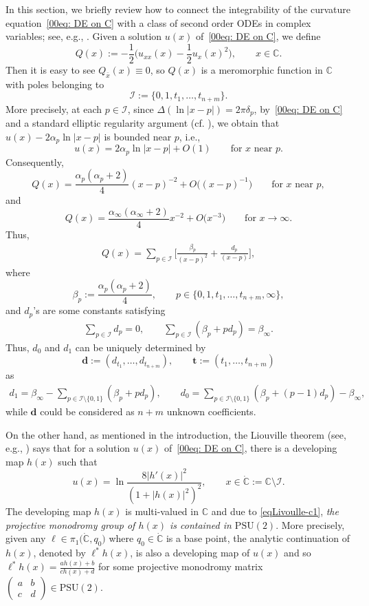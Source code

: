 \documentclass[10pt,a4paper]{amsart}
\numberwithin{equation}{section}
\def\C{\mathbb C}
\def\PSU{\mathrm{PSU}}
\def\SM#1#2#3#4{\left(\begin{smallmatrix}#1&#2\\#3&#4\end{smallmatrix}
 \right)}
\def\bt{\boldsymbol t}
\begin{document}
In this section, we briefly review how to connect the integrability of the curvature equation~\eqref{00eq: DE on C} with a class of second order ODEs in complex variables; see, e.g., \cite{Chai-Lin-Wang,Coaxial}. Given a solution $u(x)$ of~\eqref{00eq: DE on C}, we define
\begin{equation*}%
 Q(x):=-\frac12\biggl(u_{xx}(x)-\frac12 u_x(x)^2\biggr),\qquad
 x\in\mathbb{C}.
\end{equation*}
Then it is easy to see $Q_{\bar{x}}(x)\equiv 0$, so $Q(x)$ is a meromorphic function in $\mathbb{C}$ with poles belonging to
\[
 \mathcal{I}:=\{0,1,t_1,\dots,t_{n+m}\}.
\]
More precisely, at each $p\in\mathcal{I}$, since $\Delta (\ln|x-p|)=2\pi\delta_p$, by~\eqref{00eq: DE on C} and a standard elliptic regularity argument (cf. \cite{BM}), we obtain that $u(x)-2\alpha_p\ln|x-p|$ is bounded near $p$, i.e.,
\[u(x)=2\alpha_p\ln|x-p|+O(1)\qquad\text{for $x$ near $p$}.\]
Consequently,
\[Q(x)=\frac{\alpha_p(\alpha_p+2)}{4}(x-p)^{-2}+O\bigl((x-p)^{-1}\bigr)\qquad\text{for $x$ near $p$},\]
and
\[Q(x)=\frac{\alpha_\infty(\alpha_\infty+2)}{4}x^{-2}+O\bigl(x^{-3}\bigr)\qquad\text{for $x\to \infty$}.\]
Thus,
\begin{align}\label{e0q-30}
Q(x)=\sum_{p\in\mathcal{I}}\biggl[\frac{\beta_p}{(x-p)^2}+\frac{d_p}{(x-p)}\biggr],
\end{align}
where
\begin{equation}\label{e0q-31}
 \beta_p:=\frac{\alpha_{p}(\alpha_{p}+2)}{4},\qquad p\in \{0,1,t_1,\dots, t_{n+m},\infty\},
\end{equation}
and $d_p$'s are some constants satisfying
\begin{align}\label{e0q-32}
\sum_{p\in \mathcal{I}}d_p=0,\qquad \sum_{p\in \mathcal{I}}(\beta_p+pd_p)=\beta_\infty.
\end{align}
Thus, $d_0$ and $d_1$ can be uniquely determined by
\[
 \boldsymbol d:=(d_{t_1},\dots, d_{t_{n+m}}),\qquad
 \bt:=(t_1,\dots,t_{n+m})
\]
as
\begin{align*}%
d_1=\beta_\infty-\sum_{p\in\mathcal{I}\setminus\{0,1\}}(\beta_p+pd_p),
 \qquad d_0=\sum_{p\in \mathcal{I}\setminus\{0,1\}}
 (\beta_p+(p-1)d_p)-\beta_\infty,
\end{align*}
 while $\boldsymbol d$ could be considered as $n+m$ unknown coefficients.

On the other hand, as mentioned in the introduction, the Liouville
theorem (see, e.g., \cite{Chai-Lin-Wang}) says that for a solution
$u(x)$ of~\eqref{00eq: DE on C}, there is a developing map $h(x)$ such
that
\begin{equation}\label{eqLivoulle-c1}
u(x)=\ln\frac{8|h'(x)|^2}{(1+|h(x)|^2)^2},\qquad x\in \dot{\C}:=\mathbb{C}\setminus\mathcal{I}.
\end{equation}
The developing map $h(x)$ is multi-valued in $\mathbb{C}$ and due to
\eqref{eqLivoulle-c1}, \emph{the projective monodromy group of $h(x)$
 is contained in $\PSU(2)$}. More precisely, given any $\ell\in
\pi_1\bigl(\dot{\C}, q_0\bigr)$ where $q_0\in\dot{\C}$ is a base point, the
analytic continuation of $h(x)$, denoted by $\ell^*h(x)$, is also a
developing map of $u(x)$ and so $\ell^*h(x)=\frac{ah(x)+b}{ch(x)+d}$
for some projective monodromy matrix $\SM{a}{b}{c}{d}\in\PSU(2)$.
\end{document}

